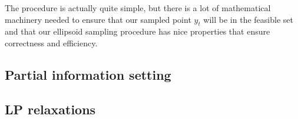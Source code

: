 The procedure is actually quite simple, but there is a lot of mathematical machinery needed to
ensure that our sampled point $y_t$ will be in the feasible set and that our ellipsoid sampling
procedure has nice properties that ensure correctness and efficiency. 


\subsection{Partial information setting}
\subsection{LP relaxations}
